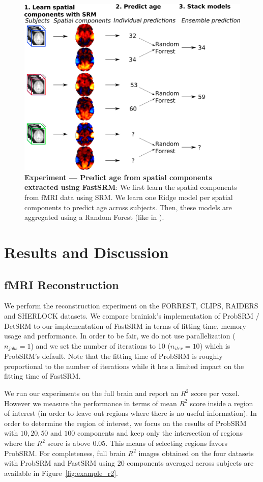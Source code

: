 \documentclass{report}
\begin{document}
{\begin{figure}
\centering
\includegraphics[scale=0.35]{figures/srm/conceptual_figure72.png}
\caption{\textbf{Experiment — Predict age from spatial components extracted using FastSRM}: We first learn the spatial components from fMRI data using SRM. We learn one Ridge model per spatial components to predict age across subjects. Then, these models are aggregated using a Random Forest (like in \cite{rahim2017joint}).} 
\label{fig:experiment_age_prediction}
\end{figure}


\section{Results and Discussion}

\subsection{fMRI Reconstruction}
We perform the reconstruction experiment on the FORREST, CLIPS, RAIDERS and SHERLOCK datasets. We compare brainiak's implementation of ProbSRM / DetSRM to our implementation of FastSRM in terms of fitting time, memory usage and performance. In order to be fair, we do not use parallelization ($n_{jobs} = 1$) and we set the number of iterations to 10 ($n_{iter}=10$) which is ProbSRM's default. Note that the fitting time of ProbSRM is roughly proportional to the number of iterations while it has a limited impact on the fitting time of FastSRM. 


We run our experiments on the full brain and report an $R^2$ score per voxel.
%
However we measure the performance in terms of mean $R^2$ score inside a region of interest (in order to leave out regions where there is no useful information).
%
In order to determine the region of interest, we focus on the results of ProbSRM with $10, 20, 50$ and $100$ components and keep only the intersection of regions where the $R^2$ score is above $0.05$.
%
This means of selecting regions favors ProbSRM. For completeness, full brain $R^2$ images obtained on the four datasets with ProbSRM and FastSRM using $20$ components averaged across subjects are available in Figure~\ref{fig:example_r2}.

}
\end{document}
